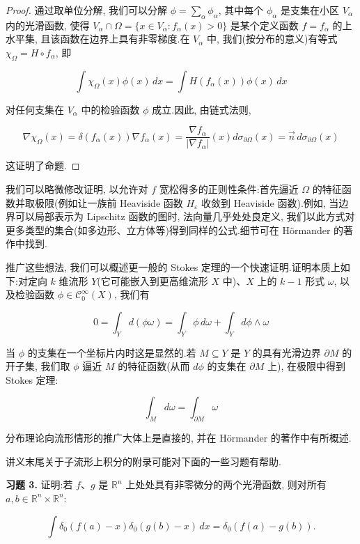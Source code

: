 \begin{proof}
通过取单位分解, 我们可以分解 $\phi = \sum_{\alpha}\phi_{\alpha}$, 其中每个 $\phi_{\alpha}$ 是支集在小区 $V_{\alpha}$ 内的光滑函数, 使得 $V_{\alpha}\cap\Omega = \{x\in V_{\alpha} : f_{\alpha}(x)>0\}$ 是某个定义函数 $f = f_{\alpha}$ 的上水平集, 且该函数在边界上具有非零梯度.在 $V_{\alpha}$ 中, 我们(按分布的意义)有等式 $\chi_{\Omega} = H\circ f_{\alpha}$, 即

\[
\int\chi_{\Omega}(x)\phi(x)\, dx = \int H(f_{\alpha}(x))\phi(x)\, dx
\]

对任何支集在 $V_{\alpha}$ 中的检验函数 $\phi$ 成立.因此, 由链式法则,

\[
\nabla\chi_{\Omega}(x) = \delta(f_{\alpha}(x))\nabla f_{\alpha}(x) = \frac{\nabla f_{\alpha}}{|\nabla f_{\alpha}|}(x)d\sigma_{\partial\Omega}(x) = \vec{n}\, d\sigma_{\partial\Omega}(x)
\]

这证明了命题.
\end{proof}

我们可以略微修改证明, 以允许对 $f$ 宽松得多的正则性条件:首先逼近 $\Omega$ 的特征函数并取极限(例如让一族前 Heaviside 函数 $H_{\varepsilon}$ 收敛到 Heaviside 函数).例如, 当边界可以局部表示为 Lipschitz 函数的图时, 法向量几乎处处良定义, 我们以此方式对更多类型的集合(如多边形、立方体等)得到同样的公式.细节可在 Hörmander 的著作\cite{ho}中找到.

推广这些想法, 我们可以概述更一般的 Stokes 定理的一个快速证明.证明本质上如下:对定向 $k$ 维流形 $Y$(它可能嵌入到更高维流形 $X$ 中)、$X$ 上的 $k-1$ 形式 $\omega$, 以及检验函数 $\phi\in\mathcal{C}_0^{\infty}(X)$, 我们有

\[
0 = \int_Y d(\phi\omega) = \int_Y\phi\, d\omega + \int_Y d\phi\wedge\omega
\]

当 $\phi$ 的支集在一个坐标片内时这是显然的.若 $M\subseteq Y$ 是 $Y$ 的具有光滑边界 $\partial M$ 的开子集, 我们取 $\phi$ 逼近 $M$ 的特征函数(从而 $d\phi$ 的支集在 $\partial M$ 上), 在极限中得到 Stokes 定理:

\[
\int_M d\omega = \int_{\partial M}\omega
\]

分布理论向流形情形的推广大体上是直接的, 并在 Hörmander 的著作中有所概述.

讲义末尾关于子流形上积分的附录可能对下面的一些习题有帮助.

\textbf{习题 3.} 证明:若 $f$、$g$ 是 $\mathbb{R}^n$ 上处处具有非零微分的两个光滑函数, 则对所有 $a, b\in\mathbb{R}^n\times\mathbb{R}^n$:

\[
\int\delta_0(f(a)-x)\delta_0(g(b)-x)\, dx = \delta_0(f(a)-g(b)).
\]


